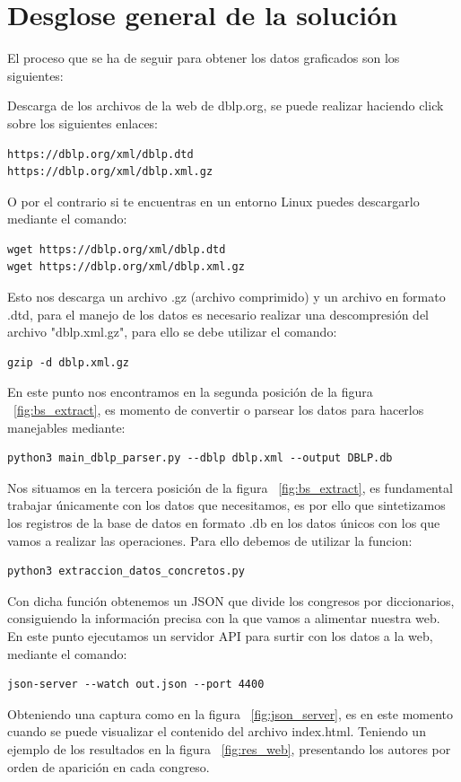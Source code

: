 \documentclass[a4paper, 12pt]{book}
\begin{document}

\section{Desglose general de la solución} 

El proceso que se ha de seguir para obtener los datos graficados son los siguientes:

Descarga de los archivos de la web de dblp.org, se puede realizar haciendo click sobre los siguientes enlaces:
\begin{verbatim}    
https://dblp.org/xml/dblp.dtd
https://dblp.org/xml/dblp.xml.gz
\end{verbatim}
O por el contrario si te encuentras en un entorno Linux puedes descargarlo mediante el comando:
\begin{verbatim}
wget https://dblp.org/xml/dblp.dtd
wget https://dblp.org/xml/dblp.xml.gz
\end{verbatim}
Esto nos descarga un archivo .gz (archivo comprimido) y un archivo en formato .dtd, para el manejo de los datos es necesario realizar una descompresión del archivo "dblp.xml.gz", para ello se debe utilizar el comando:
\begin{verbatim}
gzip -d dblp.xml.gz
\end{verbatim}
En este punto nos encontramos en la segunda posición de la figura ~\ref{fig:bs_extract}, es momento de convertir o parsear los datos para hacerlos manejables mediante:
\begin{verbatim}
python3 main_dblp_parser.py --dblp dblp.xml --output DBLP.db
\end{verbatim}
Nos situamos en la tercera posición de la figura ~\ref{fig:bs_extract}, es fundamental trabajar únicamente con los datos que necesitamos, es por ello que sintetizamos los registros de la base de datos en formato .db en los datos únicos con los que vamos a realizar las operaciones. Para ello debemos de utilizar la funcion:

\begin{verbatim}
python3 extraccion_datos_concretos.py
\end{verbatim}
Con dicha función obtenemos un JSON que divide los congresos por diccionarios, consiguiendo la información precisa con la que vamos a alimentar nuestra web. En este punto ejecutamos un servidor API para surtir con los datos a la web, mediante el comando:
\begin{verbatim}
json-server --watch out.json --port 4400
\end{verbatim}
Obteniendo una captura como en la figura ~\ref{fig:json_server}, es en este momento cuando se puede visualizar el contenido del archivo index.html. Teniendo un ejemplo de los resultados en la figura ~\ref{fig:res_web}, presentando los autores por orden de aparición en cada congreso.
\end{document}
